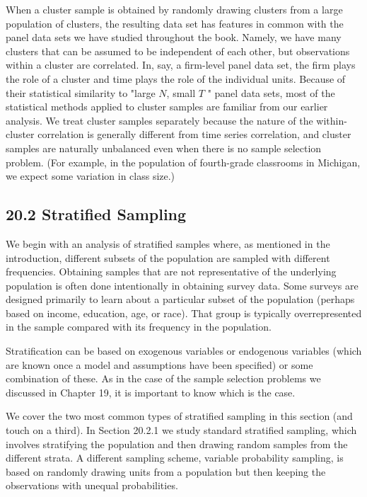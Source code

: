\documentclass[10pt]{article}
\begin{document}
When a cluster sample is obtained by randomly drawing clusters from a large population of clusters, the resulting data set has features in common with the panel data sets we have studied throughout the book. Namely, we have many clusters that can be assumed to be independent of each other, but observations within a cluster are correlated. In, say, a firm-level panel data set, the firm plays the role of a cluster and time plays the role of the individual units. Because of their statistical similarity to "large $N$, small $T$ " panel data sets, most of the statistical methods applied to cluster samples are familiar from our earlier analysis. We treat cluster samples separately because the nature of the within-cluster correlation is generally different from time series correlation, and cluster samples are naturally unbalanced even when there is no sample selection problem. (For example, in the population of fourth-grade classrooms in Michigan, we expect some variation in class size.)

\subsection*{20.2 Stratified Sampling}
We begin with an analysis of stratified samples where, as mentioned in the introduction, different subsets of the population are sampled with different frequencies. Obtaining samples that are not representative of the underlying population is often done intentionally in obtaining survey data. Some surveys are designed primarily to learn about a particular subset of the population (perhaps based on income, education, age, or race). That group is typically overrepresented in the sample compared with its frequency in the population.

Stratification can be based on exogenous variables or endogenous variables (which are known once a model and assumptions have been specified) or some combination of these. As in the case of the sample selection problems we discussed in Chapter 19, it is important to know which is the case.

We cover the two most common types of stratified sampling in this section (and touch on a third). In Section 20.2.1 we study standard stratified sampling, which involves stratifying the population and then drawing random samples from the different strata. A different sampling scheme, variable probability sampling, is based on randomly drawing units from a population but then keeping the observations with unequal probabilities.
\end{document}
